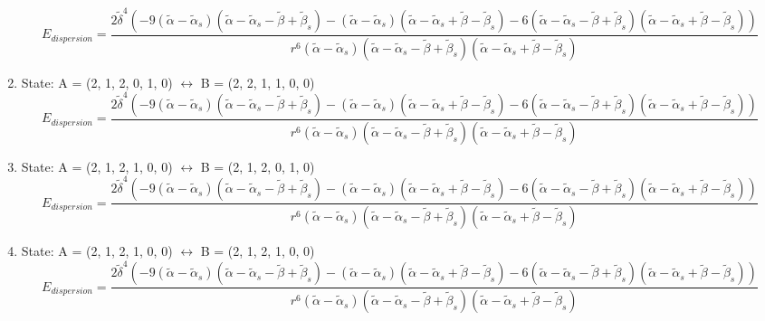 \documentclass[12pt,a4paper]{article}
\begin{document}
\begin{enumerate}
$$E_{dispersion} =\frac{2 \tilde{\delta}^{4} \left(- 9 \left(\tilde{\alpha} - \tilde{\alpha}_{s}\right) \left(\tilde{\alpha} - \tilde{\alpha}_{s} - \tilde{\beta} + \tilde{\beta}_{s}\right) - \left(\tilde{\alpha} - \tilde{\alpha}_{s}\right) \left(\tilde{\alpha} - \tilde{\alpha}_{s} + \tilde{\beta} - \tilde{\beta}_{s}\right) - 6 \left(\tilde{\alpha} - \tilde{\alpha}_{s} - \tilde{\beta} + \tilde{\beta}_{s}\right) \left(\tilde{\alpha} - \tilde{\alpha}_{s} + \tilde{\beta} - \tilde{\beta}_{s}\right)\right)}{r^{6} \left(\tilde{\alpha} - \tilde{\alpha}_{s}\right) \left(\tilde{\alpha} - \tilde{\alpha}_{s} - \tilde{\beta} + \tilde{\beta}_{s}\right) \left(\tilde{\alpha} - \tilde{\alpha}_{s} + \tilde{\beta} - \tilde{\beta}_{s}\right)}$$
 \item State: A = (2, 1, 2, 0, 1, 0) $\leftrightarrow$ B = (2, 2, 1, 1, 0, 0) 
$$E_{dispersion} =\frac{2 \tilde{\delta}^{4} \left(- 9 \left(\tilde{\alpha} - \tilde{\alpha}_{s}\right) \left(\tilde{\alpha} - \tilde{\alpha}_{s} - \tilde{\beta} + \tilde{\beta}_{s}\right) - \left(\tilde{\alpha} - \tilde{\alpha}_{s}\right) \left(\tilde{\alpha} - \tilde{\alpha}_{s} + \tilde{\beta} - \tilde{\beta}_{s}\right) - 6 \left(\tilde{\alpha} - \tilde{\alpha}_{s} - \tilde{\beta} + \tilde{\beta}_{s}\right) \left(\tilde{\alpha} - \tilde{\alpha}_{s} + \tilde{\beta} - \tilde{\beta}_{s}\right)\right)}{r^{6} \left(\tilde{\alpha} - \tilde{\alpha}_{s}\right) \left(\tilde{\alpha} - \tilde{\alpha}_{s} - \tilde{\beta} + \tilde{\beta}_{s}\right) \left(\tilde{\alpha} - \tilde{\alpha}_{s} + \tilde{\beta} - \tilde{\beta}_{s}\right)}$$
 \item State: A = (2, 1, 2, 1, 0, 0) $\leftrightarrow$ B = (2, 1, 2, 0, 1, 0) 
$$E_{dispersion} =\frac{2 \tilde{\delta}^{4} \left(- 9 \left(\tilde{\alpha} - \tilde{\alpha}_{s}\right) \left(\tilde{\alpha} - \tilde{\alpha}_{s} - \tilde{\beta} + \tilde{\beta}_{s}\right) - \left(\tilde{\alpha} - \tilde{\alpha}_{s}\right) \left(\tilde{\alpha} - \tilde{\alpha}_{s} + \tilde{\beta} - \tilde{\beta}_{s}\right) - 6 \left(\tilde{\alpha} - \tilde{\alpha}_{s} - \tilde{\beta} + \tilde{\beta}_{s}\right) \left(\tilde{\alpha} - \tilde{\alpha}_{s} + \tilde{\beta} - \tilde{\beta}_{s}\right)\right)}{r^{6} \left(\tilde{\alpha} - \tilde{\alpha}_{s}\right) \left(\tilde{\alpha} - \tilde{\alpha}_{s} - \tilde{\beta} + \tilde{\beta}_{s}\right) \left(\tilde{\alpha} - \tilde{\alpha}_{s} + \tilde{\beta} - \tilde{\beta}_{s}\right)}$$
 \item State: A = (2, 1, 2, 1, 0, 0) $\leftrightarrow$ B = (2, 1, 2, 1, 0, 0) 
$$E_{dispersion} =\frac{2 \tilde{\delta}^{4} \left(- 9 \left(\tilde{\alpha} - \tilde{\alpha}_{s}\right) \left(\tilde{\alpha} - \tilde{\alpha}_{s} - \tilde{\beta} + \tilde{\beta}_{s}\right) - \left(\tilde{\alpha} - \tilde{\alpha}_{s}\right) \left(\tilde{\alpha} - \tilde{\alpha}_{s} + \tilde{\beta} - \tilde{\beta}_{s}\right) - 6 \left(\tilde{\alpha} - \tilde{\alpha}_{s} - \tilde{\beta} + \tilde{\beta}_{s}\right) \left(\tilde{\alpha} - \tilde{\alpha}_{s} + \tilde{\beta} - \tilde{\beta}_{s}\right)\right)}{r^{6} \left(\tilde{\alpha} - \tilde{\alpha}_{s}\right) \left(\tilde{\alpha} - \tilde{\alpha}_{s} - \tilde{\beta} + \tilde{\beta}_{s}\right) \left(\tilde{\alpha} - \tilde{\alpha}_{s} + \tilde{\beta} - \tilde{\beta}_{s}\right)}$$

\end{enumerate}
\end{document}
